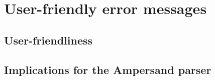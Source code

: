 
\section{User-friendly error messages}
\label{sec:errors}

\subsection{User-friendliness}
\lipsum[1]

\subsection{Implications for the Ampersand parser}
\lipsum[1]
